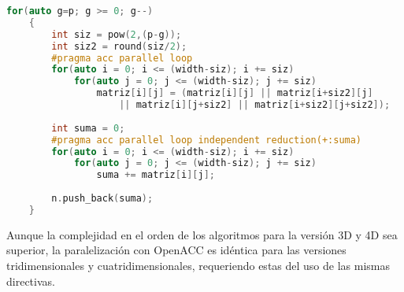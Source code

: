 \begin{lstlisting}[language=C++,caption={Primera versión del Boxcount2D paralelizado con OpenACC},label=ACCBox2D,basicstyle=\tiny]
    for(auto g=p; g >= 0; g--)
    {
        int siz = pow(2,(p-g));
        int siz2 = round(siz/2);
        #pragma acc parallel loop 
        for(auto i = 0; i <= (width-siz); i += siz)
            for(auto j = 0; j <= (width-siz); j += siz)
                matriz[i][j] = (matriz[i][j] || matriz[i+siz2][j] 
                    || matriz[i][j+siz2] || matriz[i+siz2][j+siz2]);
    
        int suma = 0; 
        #pragma acc parallel loop independent reduction(+:suma)
        for(auto i = 0; i <= (width-siz); i += siz)
            for(auto j = 0; j <= (width-siz); j += siz)
                suma += matriz[i][j];
    
        n.push_back(suma);
    }
\end{lstlisting}

Aunque la complejidad en el orden de los algoritmos para la versión 3D y 4D sea superior, la paralelización con OpenACC es idéntica para las versiones tridimensionales y cuatridimensionales, requeriendo estas del uso de las mismas directivas.